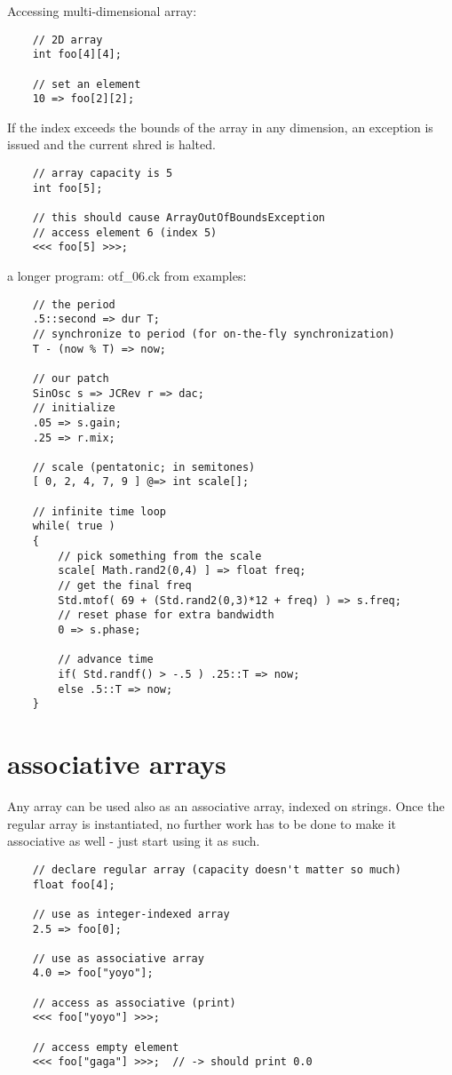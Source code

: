 Accessing multi-dimensional array:
\begin{verbatim}
    // 2D array
    int foo[4][4];

    // set an element
    10 => foo[2][2];
\end{verbatim}

If the index exceeds the bounds of the array in any dimension, an exception is issued and the current shred is halted.
\begin{verbatim}
    // array capacity is 5
    int foo[5];

    // this should cause ArrayOutOfBoundsException
    // access element 6 (index 5)
    <<< foo[5] >>>;
\end{verbatim}

a longer program: otf\_06.ck from examples:
\begin{verbatim}
    // the period
    .5::second => dur T;
    // synchronize to period (for on-the-fly synchronization)
    T - (now % T) => now;

    // our patch
    SinOsc s => JCRev r => dac;
    // initialize
    .05 => s.gain;
    .25 => r.mix;

    // scale (pentatonic; in semitones)
    [ 0, 2, 4, 7, 9 ] @=> int scale[];

    // infinite time loop
    while( true )
    {
        // pick something from the scale
        scale[ Math.rand2(0,4) ] => float freq;
        // get the final freq
        Std.mtof( 69 + (Std.rand2(0,3)*12 + freq) ) => s.freq;
        // reset phase for extra bandwidth
        0 => s.phase;

        // advance time
        if( Std.randf() > -.5 ) .25::T => now;
        else .5::T => now;
    }
\end{verbatim}
 

\section{associative arrays}

Any array can be used also as an associative array, indexed on strings. Once the regular array is instantiated, no further work has to be done to make it associative as well - just start using it as such.
\begin{verbatim}
    // declare regular array (capacity doesn't matter so much)
    float foo[4];

    // use as integer-indexed array
    2.5 => foo[0];

    // use as associative array
    4.0 => foo["yoyo"];

    // access as associative (print)
    <<< foo["yoyo"] >>>;

    // access empty element
    <<< foo["gaga"] >>>;  // -> should print 0.0
\end{verbatim}

